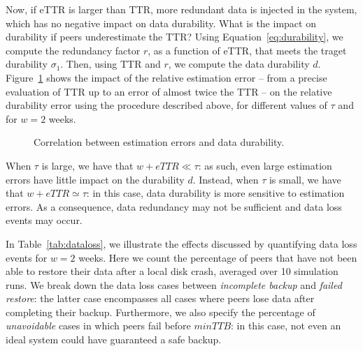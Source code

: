 Now, if eTTR is larger than TTR, more redundant data is injected
in the system, which has no negative impact on data durability. What
is the impact on durability if peers underestimate the TTR?  Using
Equation~\ref{eq:durability}, we compute the redundancy factor $r$, as a
function of eTTR, that meets the traget durability $\sigma_1$. Then,
using TTR and $r$, we compute the data durability
$d$. Figure~\ref{fig:durability} shows the impact of the relative
estimation error -- from a precise evaluation of TTR up to an error
of almost twice the TTR -- on the relative durability error using
the procedure described above, for different values of $\tau$ and for
$w=2$ weeks.
\begin{figure}[ht]
  \centering
 \caption{Correlation between estimation errors and data durability.}
 \label{fig:durability}
\end{figure}
 When $\tau$ is large, we have that $w+eTTR \ll \tau$: as such, even
large estimation errors have little impact on the durability
$d$. Instead, when $\tau$ is small, we have that $w+eTTR \simeq \tau$: in
this case, data durability is more sensitive to estimation errors. As
a consequence, data redundancy may not be sufficient and data loss
events may occur.

In Table~\ref{tab:dataloss}, we illustrate the effects discussed by
quantifying data loss events for $w=2$ weeks. Here we count the
percentage of peers that have not been able to restore their data
after a local disk crash, averaged over 10 simulation runs. We break
down the data loss cases between \emph{incomplete backup}
and \emph{failed restore}: the latter case encompasses all cases where
peers lose data after completing their backup. Furthermore, we also
specify the percentage of \emph{unavoidable} cases in which peers fail
before $minTTB$: in this case, not even an ideal system could have
guaranteed a safe backup.

